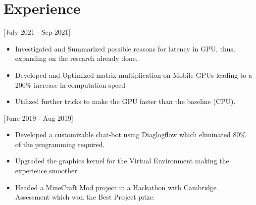 \documentclass[11pt]{article}
\begin{document}

\section{ Experience}

[July 2021 - Sep 2021]
\begin{itemize}
    \item Investigated and Summarized possible reasons for latency in GPU, thus, expanding on the research already done. 
    \item Developed and Optimized matrix multiplication on Mobile GPUs leading to a 200\% increase in computation speed
    \item Utilized further tricks to make the GPU faster than the baseline (CPU).
\end{itemize}


[June 2019 - Aug 2019]
\begin{itemize}
    \item Developed a customizable chat-bot using Diaglogflow which eliminated 80\% of the programming required.
    \item Upgraded the graphics kernel for the Virtual Environment making the experience smoother. 
    \item Headed a MineCraft Mod project in a Hackathon with Cambridge Assessment which won the Best Project prize.
\end{itemize}

\end{document}
